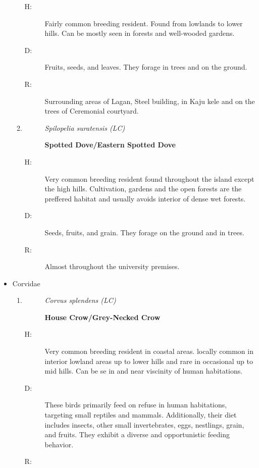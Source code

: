 \begin{itemize}
\begin{enumerate}
\begin{description}
\item[H: ]%
Fairly common breeding resident. Found from lowlands to lower hills. Can be mostly seen in forests and well{-}wooded gardens.%
\item[D: ]%
Fruits, seeds, and leaves. They forage in trees and on the ground.%
\item[R: ]%
Surrounding areas of Lagan, Steel building, in Kaju kele and on the trees of Ceremonial courtyard.%
\end{description}%
\item%
\begin{description}%
\item[]%
\textit{Spilopelia suratensis (LC)}%
\item[]%
\textbf{Spotted Dove/Eastern Spotted Dove}%
\end{description}%
\begin{description}%
\item[H: ]%
Very common breeding resident found throughout the island except the high hills. Cultivation, gardens and the open forests are the preffered habitat and usually avoids interior of dense wet forests.%
\item[D: ]%
Seeds, fruits, and grain. They forage on the ground and in trees.%
\item[R: ]%
Almost throughout the university premises.%
\end{description}%
\end{enumerate}%
\item%
Corvidae%
\begin{enumerate}%
\item%
\begin{description}%
\item[]%
\textit{Corvus splendens (LC)}%
\item[]%
\textbf{House Crow/Grey{-}Necked Crow}%
\end{description}%
\begin{description}%
\item[H: ]%
Very common breeding resident in coastal areas. locally common in interior lowland areas up to lower hills and rare in occasional up to mid hills. Can be se in and near viscinity of human habitations.%
\item[D: ]%
These birds primarily feed on refuse in human habitations, targeting small reptiles and mammals. Additionally, their diet includes insects, other small invertebrates, eggs, nestlings, grain, and fruits. They exhibit a diverse and opportunistic feeding behavior.%
\item[R: ]%

\end{description}
\end{enumerate}
\end{itemize}

